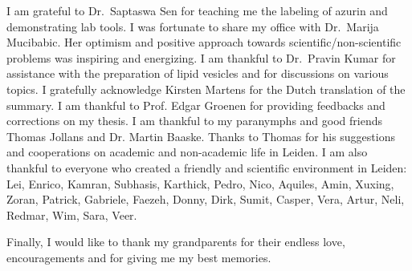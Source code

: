 I am grateful to Dr.~Saptaswa Sen for teaching me the labeling of azurin and demonstrating lab tools.
I was fortunate to share my office with Dr.~Marija Mucibabic. Her optimism and positive approach towards scientific/non-scientific problems was inspiring and energizing.
I am thankful to Dr.~Pravin Kumar for assistance with the preparation of lipid vesicles and for discussions on various topics.
I gratefully acknowledge Kirsten Martens for the Dutch translation of the summary.
I am thankful to Prof. Edgar Groenen for providing feedbacks and corrections on my thesis.
I am thankful to my paranymphs and good friends Thomas Jollans and Dr. Martin Baaske.
Thanks to Thomas for his suggestions and cooperations on academic and non-academic life in Leiden.
I am also thankful to everyone who created a friendly and scientific environment in Leiden: Lei, Enrico, Kamran, Subhasis, Karthick, Pedro, Nico, Aquiles, Amin, Xuxing, Zoran, Patrick, Gabriele, Faezeh, Donny, Dirk, Sumit, Casper, Vera, Artur, Neli, Redmar, Wim, Sara, Veer.%

Finally, I would like to thank my grandparents for their endless love, encouragements and for giving me my best memories.